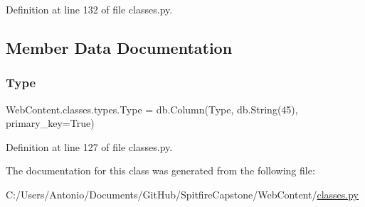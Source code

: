Definition at line 132 of file classes.\+py.



\subsection{Member Data Documentation}
\mbox{\label{class_web_content_1_1classes_1_1types_a14ba7df18201fb701b0408d06bc4c058}} 
\subsubsection{\texorpdfstring{Type}{Type}}
{\footnotesize\ttfamily Web\+Content.\+classes.\+types.\+Type = db.\+Column(\textquotesingle{}Type\textquotesingle{}, db.\+String(45), primary\+\_\+key=True)\hspace{0.3cm}{\ttfamily [static]}}



Definition at line 127 of file classes.\+py.



The documentation for this class was generated from the following file\+:\begin{DoxyCompactItemize}
\item 
C\+:/\+Users/\+Antonio/\+Documents/\+Git\+Hub/\+Spitfire\+Capstone/\+Web\+Content/\hyperlink{classes_8py}{classes.\+py}\end{DoxyCompactItemize}
